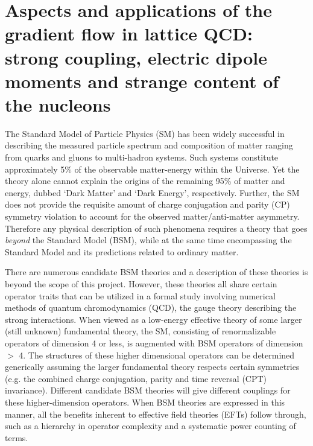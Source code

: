 \documentclass[aps,prc,twocolumn,showpacs,floatfix,nofootinbib,preprintnumbers,superscriptaddress,amsmath,amssymb]{revtex4-1}
\begin{document}
\pagestyle{plain}

\section*{Aspects and applications of the gradient flow in lattice QCD: 
strong coupling, electric dipole moments and strange content of the nucleons}

The Standard Model of Particle Physics (SM) has been widely successful in describing 
the measured particle spectrum and composition of matter ranging from quarks and gluons 
to multi-hadron systems.  Such systems constitute approximately 5\% of the observable 
matter-energy within the Universe.  Yet the theory alone cannot explain the origins of 
the remaining 95\% of matter and energy, dubbed `Dark Matter' and `Dark Energy', respectively.  
Further, the SM does not provide the requisite amount of charge conjugation and parity (CP) 
symmetry violation to account for the observed matter/anti-matter asymmetry.  Therefore any physical description of such 
phenomena requires a theory that goes \emph{beyond} the Standard Model (BSM), while at the 
same time encompassing the Standard Model and its predictions related to ordinary matter.

There are numerous candidate BSM theories and a description of these theories is 
beyond the scope of this project.  However, these theories all share certain operator 
traits that can be utilized in a formal study involving numerical methods of 
quantum chromodynamics (QCD), the gauge theory describing the strong interactions.  
When viewed as a low-energy effective theory of some larger (still unknown) fundamental theory, 
the SM, consisting of renormalizable operators of dimension 4 or less, 
is augmented with BSM operators of dimension $>$ 4.  The structures of these higher 
dimensional operators can be determined generically assuming the larger fundamental theory 
respects certain symmetries (e.g. the combined charge conjugation, parity and time reversal (CPT) invariance). 
Different candidate BSM theories will give different couplings for these higher-dimension operators.  When BSM theories 
are expressed in this manner, all the benefits inherent to effective field theories (EFTs) follow through, 
such as a hierarchy in operator complexity and a systematic power counting of terms.
\end{document}

